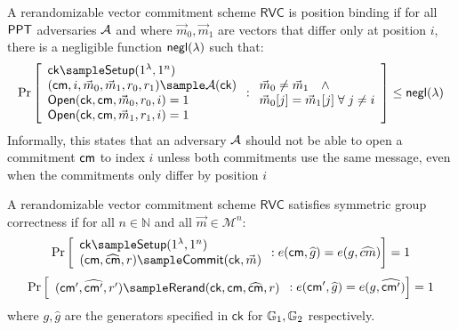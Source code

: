 \begin{definition}
A rerandomizable vector commitment scheme $\mathsf{RVC}$ is position binding if for all $\mathsf{PPT}$ adversaries $\mathcal{A}$ and where $\vec{m}_0, \vec{m}_1$ are vectors that differ only at position $i$, there is a negligible function ${\mathsf{negl}(\lambda)}$ such that:
\[
    \Pr
    \left[
        \begin{array}{l}
        \mathsf{ck} \sample \mathsf{Setup}(1^\lambda, 1^n) \\
        (\cm, i, \vec{m}_0, \vec{m}_1, r_0, r_1) \sample \mathcal{A}(\mathsf{ck}) \\
        \mathsf{Open}(\ck, \cm, \vec{m}_0, r_0, i) = 1 \\
        \mathsf{Open}(\ck, \cm, \vec{m}_1, r_1, i) = 1 \\
        \end{array}
        : \begin{array}{l}
            \vec{m}_0 \neq \vec{m}_1 \quad \wedge\\
            \vec{m}_0[j] = \vec{m}_1[j] \; \forall \; j \neq i \\
          \end{array}
    \right] \leq \negl
\]
Informally, this states that an adversary $\mathcal{A}$ should not be able to open a commitment $\mathsf{cm}$ to index $i$ unless both commitments use the same message, even when the commitments only differ by position $i$
\end{definition}





\begin{definition}
A rerandomizable vector commitment scheme $\mathsf{RVC}$ satisfies symmetric group correctness if for all $n \in \mathbb{N}$ and all $\vec{m} \in \mathcal{M}^n$:
  \[
        \Pr\left[
        \begin{array}{l}
            \mathsf{ck} \sample \mathsf{Setup}(1^\lambda, 1^n) \\
            (\cm, \widehat{\cm}, r) \sample \mathsf{Commit}(\mathsf{ck}, \vec{m})
        \end{array}
        : e(\cm, \widehat{g}) = e(g, \widehat{cm})
        \right] = 1
    \]
    \[
        \Pr\left[
        \begin{array}{l}
            (\cm', \widehat{\cm'}, r') \sample \mathsf{Rerand}(\mathsf{ck}, \cm, \widehat{\cm}, r)
        \end{array}
        : e(\cm', \widehat{g}) = e(g, \widehat{\cm'})
        \right] = 1
    \]
\noindent where $g, \widehat{g}$ are the generators specified in $\mathsf{ck}$ for $\mathbb{G}_1, \mathbb{G}_2$ respectively.
\end{definition}




